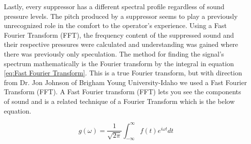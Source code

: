 Lastly, every suppressor has a different spectral profile regardless of sound pressure levels. The pitch produced by a suppressor seems to play a previously unrecognized role in the comfort to the operator's experience. Using a Fast Fourier Transform (FFT), the frequency content of the suppressed sound and their respective pressures were calculated and understanding was gained where there was previously only speculation. The method for finding the signal's spectrum mathematically is the Fourier transform by the integral in equation \ref{eq:Fast Fourier Transform}. This is a true Fourier transform, but with direction from Dr. Jon Johnson of Brigham Young University-Idaho we used a Fast Fourier Transform (FFT). A Fast Fourier transform (FFT) lets you see the components of sound and is a related technique of a Fourier Transform which is the below equation.



\begin{equation}
	g(\omega)=\frac{1}{\sqrt{2 \pi}} \int_{-\infty}^{\infty}f(t)e^{i \omega t} dt
	\label{eq:Fast Fourier Transform}
\end{equation}
